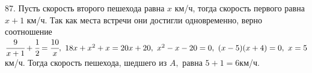 87. Пусть скорость второго пешехода равна $x$ км/ч, тогда скорость первого равна $x+1$ км/ч. Так как места встречи они достигли одновременно, верно соотношение $\cfrac{9}{x+1}+\cfrac{1}{2}=\cfrac{10}{x},\
18x+x^2+x=20x+20,\ x^2-x-20=0,\ (x-5)(x+4)=0,\ x=5$км/ч. Тогда скорость пешехода, шедшего из $A,$ равна $5+1=6$км/ч.\\
